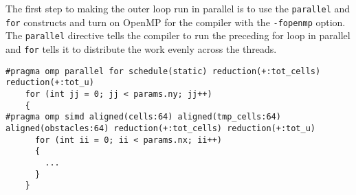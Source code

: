 \documentclass{article}
\begin{document}
\begin{multicols}{2}
The first step to making the outer loop run in parallel is to use the
\verb|parallel| and \verb|for| constructs and turn on OpenMP for the compiler with the
\verb|-fopenmp| option. The \verb|parallel| directive tells the compiler to run
the preceding for loop in parallel and \verb|for| tells it to distribute the
work evenly across the threads.

\begin{lstlisting}[style=CStyle, label={lst:ompparallelloop}, caption={TODO},]
#pragma omp parallel for schedule(static) reduction(+:tot_cells) reduction(+:tot_u)
    for (int jj = 0; jj < params.ny; jj++)
    {    
#pragma omp simd aligned(cells:64) aligned(tmp_cells:64) aligned(obstacles:64) reduction(+:tot_cells) reduction(+:tot_u)
      for (int ii = 0; ii < params.nx; ii++)
      {
        ...
      }
    }
\end{lstlisting}



\end{multicols}
\end{document}
